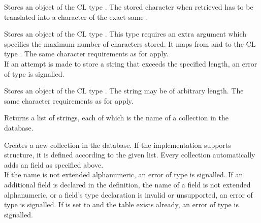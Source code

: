 Stores an object of the CL type . The stored character when retrieved has to be translated into a character of the exact same .

Stores an object of the CL type . This type requires an extra argument which specifies the maximum number of characters stored. It maps from and to the CL type . The same character requirements as for  apply. \\

\noindent If an attempt is made to store a string that exceeds the specified length, an error of type  is signalled.

Stores an object of the CL type . The string may be of arbitrary length. The same character requirements as for  apply.

Returns a list of strings, each of which is the name of a collection in the database.

Creates a new collection in the database. If the implementation supports structure, it is defined according to the given  list. Every collection automatically adds an  field as specified above. \\

\noindent If the  name is not extended alphanumeric, an error of type  is signalled. If an additional  field is declared in the  definition, the name of a field is not extended alphanumeric, or a field's type declaration is invalid or unsupported, an error of type  is signalled. If  is set to  and the table exists already, an error of type  is signalled.

